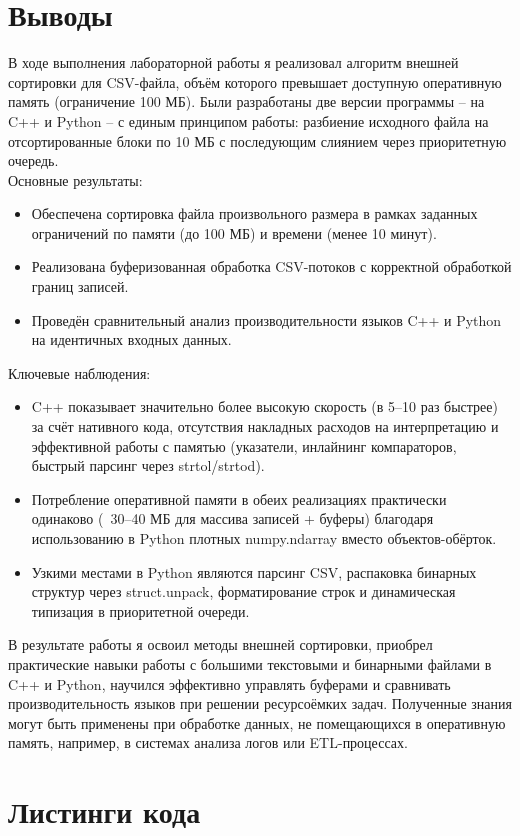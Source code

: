 \documentclass[oneside,a4paper,14pt]{extarticle} %
\begin{document}
	\section*{Выводы}
	В ходе выполнения лабораторной работы я реализовал алгоритм внешней сортировки для CSV-файла,
	объём которого превышает доступную оперативную память (ограничение 100 МБ).
	Были разработаны две версии программы – на C++ и Python – с единым принципом работы:
	разбиение исходного файла на отсортированные блоки по 10 МБ с последующим слиянием через приоритетную очередь. \\
	\newline
	Основные результаты: \begin{itemize}
		\item Обеспечена сортировка файла произвольного размера в рамках заданных ограничений по памяти (до 100 МБ) и времени (менее 10 минут).
		\item Реализована буферизованная обработка CSV-потоков с корректной обработкой границ записей.
		\item Проведён сравнительный анализ производительности языков C++ и Python на идентичных входных данных.
	\end{itemize}
	Ключевые наблюдения: \begin{itemize}
		\item C++ показывает значительно более высокую скорость (в 5–10 раз быстрее) за счёт нативного кода, отсутствия накладных расходов на интерпретацию и эффективной работы с памятью (указатели, инлайнинг компараторов, быстрый парсинг через strtol/strtod).
		\item Потребление оперативной памяти в обеих реализациях практически одинаково (~30–40 МБ для массива записей + буферы) благодаря использованию в Python плотных numpy.ndarray вместо объектов-обёрток.
		\item Узкими местами в Python являются парсинг CSV, распаковка бинарных структур через struct.unpack, форматирование строк и динамическая типизация в приоритетной очереди.
	\end{itemize}
	В результате работы я освоил методы внешней сортировки,
	приобрел практические навыки работы с большими текстовыми и бинарными файлами в C++ и Python,
	научился эффективно управлять буферами и сравнивать производительность языков при решении ресурсоёмких задач.
	Полученные знания могут быть применены при обработке данных, не помещающихся в оперативную память, 
	например, в системах анализа логов или ETL-процессах.
	\section*{Листинги кода}
	
	\newpage
	
	
	\newpage
	
	\newpage
	
\end{document}
